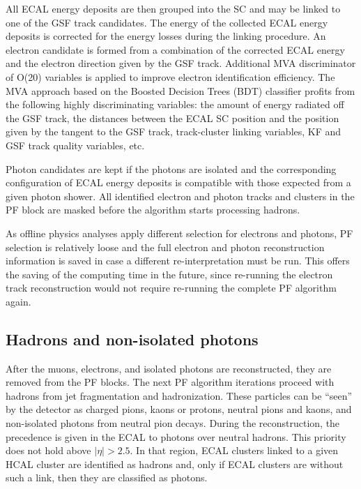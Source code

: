 All ECAL energy deposits are then grouped into the SC and may be linked to one of the GSF track candidates. The energy of the collected ECAL energy deposits is corrected for the energy losses during the linking procedure. An electron candidate is formed from a combination of the corrected ECAL energy and the electron direction given by the GSF track. Additional MVA discriminator of O(20) variables is applied to improve electron identification efficiency. The MVA approach based on the Boosted Decision Trees (BDT) classifier \cite{TMVA} profits from the following highly discriminating variables: the amount of energy radiated off the GSF track, the distances between the ECAL SC position and the position given by the tangent to the GSF track, track-cluster linking variables, KF and GSF track quality variables, etc. 

Photon candidates are kept if the photons are isolated and the corresponding configuration of ECAL energy deposits is compatible with those expected from a given photon shower.  All identified electron and photon tracks and clusters in the PF block are masked before the algorithm starts processing hadrons. 

As offline physics analyses apply different selection for electrons and photons, PF selection is relatively loose and  the full electron and photon reconstruction information is saved in case a different re-interpretation must be run. This offers the saving of the computing time in the future, since re-running the electron track reconstruction would not require re-running the complete PF algorithm again.

\subsection{Hadrons and non-isolated photons}\label{sec:hadrons}

After the muons, electrons, and isolated photons are reconstructed, they are removed from the PF blocks. The next PF algorithm iterations proceed with hadrons from jet fragmentation and hadronization. These particles can be ``seen'' by the detector as charged pions, kaons or protons, neutral pions and kaons, and non-isolated photons from neutral pion decays. During the reconstruction, the precedence is given in the ECAL to photons over neutral hadrons. This priority does not hold above $|\eta| > 2.5$. In that region, ECAL clusters linked to a given HCAL cluster are identified as hadrons and, only if ECAL clusters are without such a link, then they are classified as photons.  

